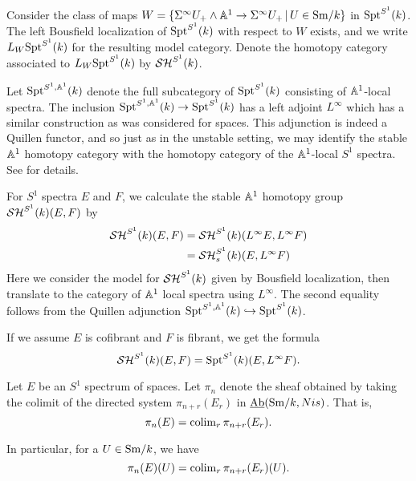 \documentclass{amsart}%
\begin{document}
\begin{definition}
  Consider the class of maps
  $ W = \{\Sigma^{\infty} U_+ \wedge \mathbb{A}^1 \to \Sigma^{\infty}U_+ \, \vert \,
  U \in \mathrm{Sm}/k\}$
  in $\mathrm{Spt}^{S^1}(k)$. The left Bousfield localization of
  $\mathrm{Spt}^{S^1}(k)$ with respect to $W$ exists, and we write
  $L_W\mathrm{Spt}^{S^1}(k)$ for the resulting model category. Denote the
  homotopy category associated to $L_W\mathrm{Spt}^{S^1}(k)$ by
  $\mathcal{SH}^{S^1}(k)$.
\end{definition}

\begin{remark}
  Let $\mathrm{Spt}^{S^1,\mathbb{A}^1}(k)$ denote the full subcategory of
  $\mathrm{Spt}^{S^1}(k)$ consisting of $\mathbb{A}^1$-local spectra. The inclusion
  $\mathrm{Spt}^{S^1, \mathbb{A}^1}(k) \to \mathrm{Spt}^{S^1}(k)$ has a left adjoint
  $L^{\infty}$ which has a similar construction as was considered for
  spaces. This adjunction is indeed a Quillen functor, and so just as
  in the unstable setting, we may identify the stable $\mathbb{A}^1$
  homotopy category with the homotopy category of the $\mathbb{A}^1$-local
  $S^1$ spectra. See \cite[\S4.2]{Mor05} for details.


  For $S^1$ spectra $E$ and $F$, we calculate the stable $\mathbb{A}^1$
  homotopy group$\mathcal{SH}^{S^1}(k)(E,F)$ by
  \begin{align*}
    \mathcal{SH}^{S^1}(k)(E,F) & = \mathcal{SH}^{S^1}(k)(L^{\infty} E, L^{\infty} F)\\
                      &= \mathcal{SH}^{S^1}_s(k)(E,L^{\infty}F)
  \end{align*}
  Here we consider the model for $\mathcal{SH}^{S^1}(k)$ given by Bousfield
  localization, then translate to the category of $\mathbb{A}^1$ local
  spectra using $L^{\infty}$. The second equality follows from the
  Quillen adjunction $\mathrm{Spt}^{S^1,\mathbb{A}^1}(k) \hookrightarrow \mathrm{Spt}^{S^1}(k)$.

  If we assume $E$ is cofibrant and $F$ is fibrant, we get the formula
  \begin{equation*}
    \mathcal{SH}^{S^1}(k)(E,F) = \mathrm{Spt}^{S^1}(k)(E,L^{\infty}F).
  \end{equation*}
\end{remark}

\begin{definition}
  Let $E$ be an $S^1$ spectrum of spaces. Let $\pi_n$ denote the sheaf
  obtained by taking the colimit of the directed system
  $\pi_{n+r}(E_r)$ in $\operatorname{\underline{Ab}}(\mathrm{Sm}/k,Nis)$. That is,
  \begin{equation*}
    \pi_n(E) = \operatorname{colim}_{r} \pi_{n+r}(E_r). 
  \end{equation*}

  In particular, for a $U \in \mathrm{Sm}/k$, we have 
  \begin{equation*}
    \pi_n(E)(U) = \operatorname{colim}_{r} \pi_{n+r}(E_r)(U).
  \end{equation*}
\end{definition}
\end{document}
